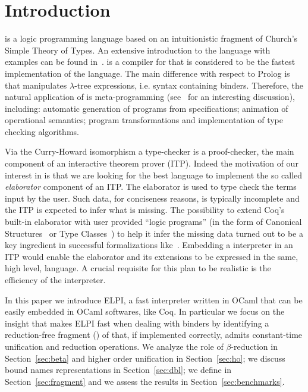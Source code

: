 \documentclass{llncs}
\begin{document}
\section{Introduction}%
\lp{} is a logic programming language based on an intuitionistic fragment of
Church's Simple Theory of Types. An extensive introduction to the language
with examples can be found in~\cite{Miller:2012:PHL:2331097}. \tedius{}
\cite{DBLP:conf/cade/NadathurM99,DBLP:journals/jar/LiangNQ04} is a
compiler for \lp{} %
that is considered to be the fastest
implementation of the language. 
The main difference with respect to Prolog is that \lp{} manipulates
$\lambda$-tree expressions, i.e. syntax containing binders. Therefore, the
natural application of \lp{} is meta-programming (see~\cite{LPAZ} for
an interesting discussion), including: automatic generation of programs from
specifications; animation of operational semantics;
program transformations and implementation of type checking algorithms.

Via the Curry-Howard isomorphism a type-checker is a proof-checker, the main
component of an interactive theorem prover (ITP). Indeed the motivation of our
interest in \lp{} is that we are looking for the best 
language to implement the so called \emph{elaborator} component of an ITP.
The elaborator is used to type check the terms input by
the user. Such data, for conciseness reasons, is typically incomplete and
the ITP is expected to infer what is missing. The possibility to
extend Coq's built-in elaborator with user provided ``logic programs'' (in the
form of
Canonical Structures~\cite{hints2,hints}
or
Type Classes~\cite{TCcoq}) to help it infer 
the missing data %
turned out to be a key ingredient in successful formalizations
like~\cite{gonthier:hal-00816699}. Embedding a \lp{} interpreter in an ITP
would enable the elaborator and its extensions to be expressed in the same,
high level, language. A crucial requisite for this plan to be realistic is
the efficiency of the \lp{} interpreter.

In this paper we introduce ELPI, a fast \lp{} interpreter written in OCaml
that can be easily embedded in OCaml softwares, like Coq.
In particular we focus on the insight that makes ELPI fast when dealing with
binders by identifying a reduction-free fragment (\rff{}) of \lp{} that, if
implemented correctly, admits constant-time unification and reduction
operations.
We analyze the role of $\beta$-reduction in Section~\ref{sec:beta} and
higher order unification in Section~\ref{sec:ho}; we discuss bound names
representations in Section~\ref{sec:dbl}; we define \rff{} 
in Section~\ref{sec:fragment} and we assess the results in
Section~\ref{sec:benchmarks}.
\end{document}
